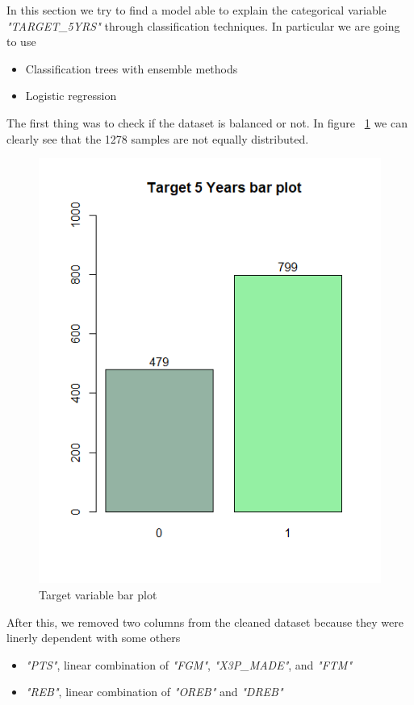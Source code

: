 In this section we try to find a model able to explain the categorical variable \textit{"TARGET\_5YRS"} through classification techniques.
In particular we are going to use 
\begin{itemize}
	\item Classification trees with ensemble methods
	\item Logistic regression
\end{itemize}

The first thing was to check if the dataset is balanced or not. In figure \Fig~\ref{fig:target_bar_plot} we can clearly see that the 1278 samples are not equally distributed. 

\begin{figure}[h]
	\centering
	\includegraphics[width=0.5\linewidth]{ImageFiles/Classification/target_bar_plot}
	\caption{Target variable bar plot}
	\label{fig:target_bar_plot}
\end{figure}

After this, we removed two columns from the cleaned dataset because they were linerly dependent with some others
\begin{itemize}
	\item \textit{"PTS"}, linear combination of \textit{"FGM"}, \textit{"X3P\_MADE"}, and \textit{"FTM"}
	\item \textit{"REB"}, linear combination of \textit{"OREB"} and \textit{"DREB"}
\end{itemize}
